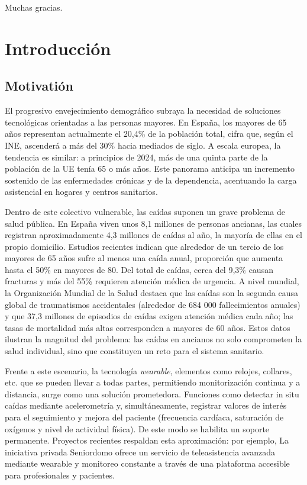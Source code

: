 \documentclass[12pt, a4paper]{article}
\begin{document}
\vspace{1em}

Muchas gracias.

\tableofcontents

\section{Introducción}

	\subsection{Motivatión}
    
    El progresivo envejecimiento demográfico subraya la necesidad de soluciones tecnológicas orientadas a las personas mayores. En España, los mayores de 65 años representan actualmente el 20,4\% de la población total, cifra que, según el INE\cite{INE2024}, ascenderá a más del 30\% hacia mediados de siglo. A escala europea, la tendencia es similar: a principios de 2024, más de una quinta parte de la población de la UE tenía 65 o más años\cite{Euro2025}. Este panorama anticipa un incremento sostenido de las enfermedades crónicas y de la dependencia, acentuando la carga asistencial en hogares y centros sanitarios.
    
    Dentro de este colectivo vulnerable, las caídas suponen un grave problema de salud pública. En España viven unos 8,1 millones de personas ancianas, las cuales registran aproximadamente 4,3 millones de caídas al año, la mayoría de ellas en el propio domicilio\cite{Rodriguez2015}. Estudios recientes indican que alrededor de un tercio de los mayores de 65 años sufre al menos una caída anual, proporción que aumenta hasta el 50\% en mayores de 80. Del total de caídas, cerca del 9,3\% causan fracturas y más del 55\% requieren atención médica de urgencia. A nivel mundial, la Organización Mundial de la Salud destaca que las caídas son la segunda causa global de traumatismos accidentales (alrededor de 684 000 fallecimientos anuales) y que 37,3 millones de episodios de caídas exigen atención médica cada año; las tasas de mortalidad más altas corresponden a mayores de 60 años\cite{OMS2021}. Estos datos ilustran la magnitud del problema: las caídas en ancianos no solo comprometen la salud individual, sino que constituyen un reto para el sistema sanitario.
    
    Frente a este escenario, la tecnología \emph{wearable}, elementos como relojes, collares, etc. que se pueden llevar a todas partes, permitiendo monitorización continua y a distancia, surge como una solución prometedora. Funciones como detectar in situ caídas mediante acelerometría y, simultáneamente, registrar valores de interés para el seguimiento y mejora del paciente (frecuencia cardíaca, saturación de oxígenos y nivel de actividad física). De este modo se habilita un soporte permanente. Proyectos recientes respaldan esta aproximación: por ejemplo, La iniciativa privada Seniordomo ofrece un servicio de teleasistencia avanzada mediante wearable y monitoreo constante a través de una plataforma accesible para profesionales y pacientes\cite{seniordomo}. 
    
\end{document}
